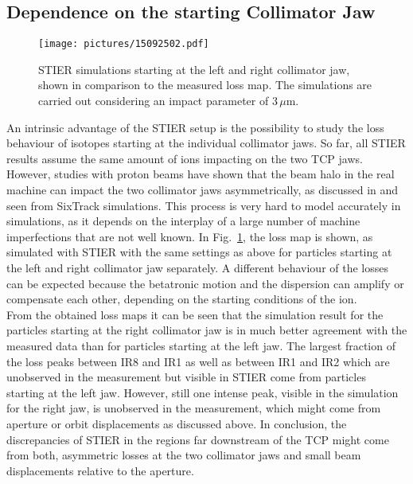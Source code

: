 \subsection{Dependence on the starting Collimator Jaw}

\begin{figure}[t]
  \begin{center}
\texttt{[image: pictures/15092502.pdf]}
\caption{STIER simulations starting at the left and right collimator jaw, shown in comparison to the measured loss map. The simulations are carried out considering an impact parameter of $3\,\mu$m. }
\label{fig:15032201.pdf}
  \end{center}
\end{figure}

An intrinsic advantage of the STIER setup is the possibility to study the loss behaviour of isotopes starting at the individual collimator jaws. So far, all STIER results assume the same amount of ions impacting on the two TCP jaws. However, studies with proton beams have shown that the beam halo in the real machine can impact the two collimator jaws asymmetrically, as discussed in \cite{Bruce2014a} and seen from SixTrack simulations. This process is very hard to model accurately in simulations, as it depends on the interplay of a large number of machine imperfections that are not well known. In Fig.~\ref{fig:15032201.pdf}, the loss map is shown, as simulated with STIER with the same settings as above for particles starting at the left and right collimator jaw separately. A different behaviour of the losses can be expected because the betatronic motion and the dispersion can amplify or compensate each other, depending on the starting conditions of the ion.
\\
From the obtained loss maps it can be seen that the simulation result for the particles starting at the right collimator jaw is in much better agreement with the measured data than for particles starting at the left jaw. The largest fraction of the loss peaks between IR8 and IR1 as well as between IR1 and IR2 which are unobserved in the measurement but visible in STIER come from particles starting at the left jaw. However, still one intense peak, visible in the simulation for the right jaw, is unobserved in the measurement, which might come from aperture or orbit displacements as discussed above. In conclusion, the discrepancies of STIER in the regions far downstream of the TCP might come from both, asymmetric losses at the two collimator jaws and small beam displacements relative to the aperture. 







